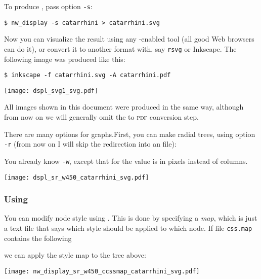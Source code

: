 To produce \svg, pass option \texttt{-s}:
\begin{verbatim}
$ nw_display -s catarrhini > catarrhini.svg
\end{verbatim}

Now you can visualize the result using any \svg-enabled tool (all good Web browsers can do it), or convert it to another format with, say \texttt{rsvg} or Inkscape. The following image was produced like this:

\begin{verbatim}
$ inkscape -f catarrhini.svg -A catarrhini.pdf
\end{verbatim}

\begin{center}
 \texttt{[image: dspl\_svg1\_svg.pdf]}
\end{center}

All \svg{} images shown in this document were produced in the same way, although from now on we will generally omit the \svg{} to \textsc{pdf} conversion step.

There are many options for \svg{} graphs.First, you can make radial trees, using option \texttt{-r} (from now on I will skip the redirection into an \svg{} file):



You already know \texttt{-w}, except that for \svg{} the value is in pixels instead of columns. 

\begin{center}
\texttt{[image: dspl\_sr\_w450\_catarrhini\_svg.pdf]}
\end{center}

\subsubsection{Using \css}
\label{sct_display_svg_css}

You can modify node style using \css. This is done by specifying a
\textit{\css{} map}, which is just a text file that says which style should be
applied to which node. If file \texttt{css.map} contains the following
\begin{quote}  \end{quote} we can apply the style map to
the tree above:



\begin{center}
 \texttt{[image: nw\_display\_sr\_w450\_ccssmap\_catarrhini\_svg.pdf]}
\end{center}


